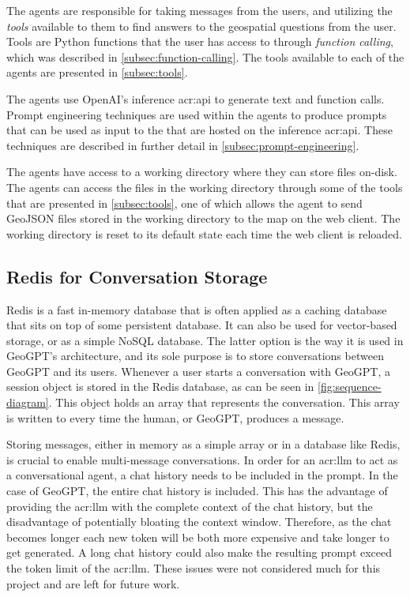 The agents are responsible for taking messages from the users, and utilizing the \textit{tools} available to them to find answers to the geospatial questions from the user. Tools are Python functions that the user has access to through \textit{function calling}, which was described in \autoref{subsec:function-calling}. The tools available to each of the agents are presented in \autoref{subsec:tools}.

The agents use OpenAI's inference \acrshort{acr:api} to generate text and function calls. Prompt engineering techniques are used within the agents to produce prompts that can be used as input to the  that are hosted on the inference \acrshort{acr:api}. These techniques are described in further detail in \autoref{subsec:prompt-engineering}.

The agents have access to a working directory where they can store files on-disk. The agents can access the files in the working directory through some of the tools that are presented in \autoref{subsec:tools}, one of which allows the agent to send GeoJSON files stored in the working directory to the map on the web client. The working directory is reset to its default state each time the web client is reloaded.


\subsection{Redis for Conversation Storage}
\label{subsec:redis-architecture}

Redis \citep{sanfilippoRedisRealtimeData2009} is a fast in-memory database that is often applied as a caching database that sits on top of some persistent database. It can also be used for vector-based storage, or as a simple NoSQL database. The latter option is the way it is used in GeoGPT's architecture, and its sole purpose is to store conversations between GeoGPT and its users. Whenever a user starts a conversation with GeoGPT, a session object is stored in the Redis database, as can be seen in \autoref{fig:sequence-diagram}. This object holds an array that represents the conversation. This array is written to every time the human, or GeoGPT, produces a message.

Storing messages, either in memory as a simple array or in a database like Redis, is crucial to enable multi-message conversations. In order for an \gls{acr:llm} to act as a conversational agent, a chat history needs to be included in the prompt. In the case of GeoGPT, the entire chat history is included. This has the advantage of providing the \gls{acr:llm} with the complete context of the chat history, but the disadvantage of potentially bloating the context window. Therefore, as the chat becomes longer each new token will be both more expensive and take longer to get generated. A long chat history could also make the resulting prompt exceed the token limit of the \gls{acr:llm}. These issues were not considered much for this project and are left for future work.

